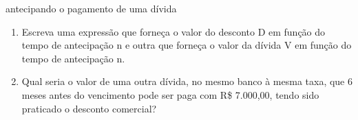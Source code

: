 \begin{task}{antecipando o pagamento de uma dívida}
\begin{enumerate}
\begin{center}
\end{center}

\item {}
Escreva uma expressão que forneça o valor do desconto D em função do tempo de antecipação n e outra que forneça o valor da dívida V em função do tempo de antecipação n.

\item {}
Qual seria o valor de uma outra dívida, no mesmo banco à mesma taxa, que 6 meses antes do vencimento pode ser paga com R\$ 7.000,00, tendo sido praticado o desconto comercial? 

\end{enumerate}

\end{task}


